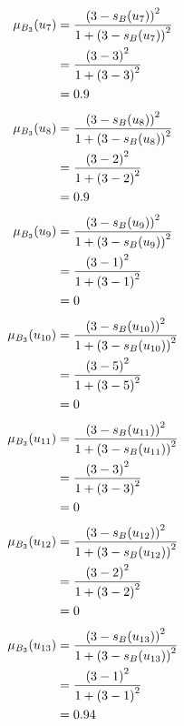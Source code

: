 \documentclass[a4paper]{book}
\begin{document}
				\begin{align}
					\mu_{B_3}(u_7) &= \frac{\left(3-s_B(u_7)\right)^2}{1 + \left(3-s_B(u_7)\right)^2}\\
					&= \frac{\left(3-3\right)^2}{1 + \left(3-3\right)^2} \notag \\
					&= 0.9 \notag
				\end{align}
				\begin{align}
					\mu_{B_3}(u_8) &= \frac{\left(3-s_B(u_8)\right)^2}{1 + \left(3-s_B(u_8)\right)^2}\\
					&= \frac{\left(3-2\right)^2}{1 + \left(3-2\right)^2} \notag \\
					&= 0.9 \notag
				\end{align}
				\begin{align}
					\mu_{B_3}(u_9) &= \frac{\left(3-s_B(u_9)\right)^2}{1 + \left(3-s_B(u_9)\right)^2}\\
					&= \frac{\left(3-1\right)^2}{1 + \left(3-1\right)^2} \notag \\
					&= 0 \notag
				\end{align}
				\begin{align}
					\mu_{B_3}(u_{10}) &= \frac{\left(3-s_B(u_{10})\right)^2}{1 + \left(3-s_B(u_{10})\right)^2}\\
					&= \frac{\left(3-5\right)^2}{1 + \left(3-5\right)^2} \notag \\
					&= 0 \notag
				\end{align}
				\begin{align}
					\mu_{B_3}(u_{11}) &= \frac{\left(3-s_B(u_{11})\right)^2}{1 + \left(3-s_B(u_{11})\right)^2}\\
					&= \frac{\left(3-3\right)^2}{1 + \left(3-3\right)^2} \notag \\
					&= 0 \notag
				\end{align}
				\begin{align}
					\mu_{B_3}(u_{12}) &= \frac{\left(3-s_B(u_{12})\right)^2}{1 + \left(3-s_B(u_{12})\right)^2}\\
					&= \frac{\left(3-2\right)^2}{1 + \left(3-2\right)^2} \notag \\
					&= 0 \notag
				\end{align}
				\begin{align}
					\mu_{B_3}(u_{13}) &= \frac{\left(3-s_B(u_{13})\right)^2}{1 + \left(3-s_B(u_{13})\right)^2}\\
					&= \frac{\left(3-1\right)^2}{1 + \left(3-1\right)^2} \notag \\
					&= 0.94 \notag
				\end{align}
\end{document}
